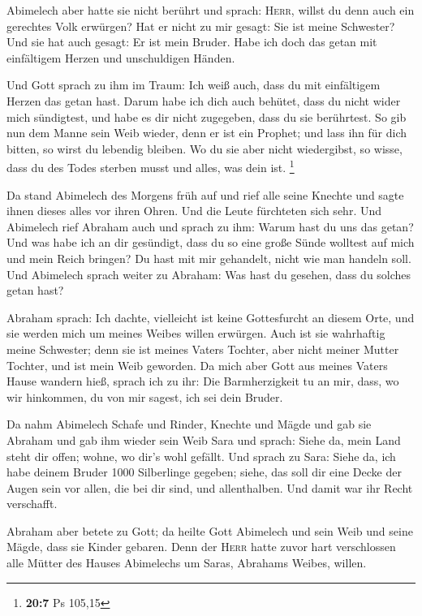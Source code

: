  Abimelech aber hatte sie nicht berührt und sprach:
\textsc{Herr}, willst du denn auch ein gerechtes Volk erwürgen?
 Hat er nicht zu mir gesagt: Sie ist meine Schwester? Und
sie hat auch gesagt: Er ist mein Bruder. Habe ich doch das getan mit
einfältigem Herzen und unschuldigen Händen.

 Und Gott sprach zu ihm im Traum: Ich weiß auch, dass du
mit einfältigem Herzen das getan hast. Darum habe ich dich auch behütet,
dass du nicht wider mich sündigtest, und habe es dir nicht zugegeben,
dass du sie berührtest.  So gib nun dem Manne sein Weib
wieder, denn er ist ein Prophet; und lass ihn für dich bitten, so wirst
du lebendig bleiben. Wo du sie aber nicht wiedergibst, so wisse, dass du
des Todes sterben musst und alles, was dein ist. \footnote{\textbf{20:7}
  Ps 105,15}

 Da stand Abimelech des Morgens früh auf und rief alle
seine Knechte und sagte ihnen dieses alles vor ihren Ohren. Und die
Leute fürchteten sich sehr.  Und Abimelech rief Abraham
auch und sprach zu ihm: Warum hast du uns das getan? Und was habe ich an
dir gesündigt, dass du so eine große Sünde wolltest auf mich und mein
Reich bringen? Du hast mit mir gehandelt, nicht wie man handeln soll.
 Und Abimelech sprach weiter zu Abraham: Was hast du
gesehen, dass du solches getan hast?

 Abraham sprach: Ich dachte, vielleicht ist keine
Gottesfurcht an diesem Orte, und sie werden mich um meines Weibes willen
erwürgen.  Auch ist sie wahrhaftig meine Schwester; denn
sie ist meines Vaters Tochter, aber nicht meiner Mutter Tochter, und ist
mein Weib geworden.  Da mich aber Gott aus meines Vaters
Hause wandern hieß, sprach ich zu ihr: Die Barmherzigkeit tu an mir,
dass, wo wir hinkommen, du von mir sagest, ich sei dein Bruder.

 Da nahm Abimelech Schafe und Rinder, Knechte und Mägde
und gab sie Abraham und gab ihm wieder sein Weib Sara 
und sprach: Siehe da, mein Land steht dir offen; wohne, wo dir's wohl
gefällt.  Und sprach zu Sara: Siehe da, ich habe deinem
Bruder 1000 Silberlinge gegeben; siehe, das soll dir eine Decke der
Augen sein vor allen, die bei dir sind, und allenthalben. Und damit war
ihr Recht verschafft.

 Abraham aber betete zu Gott; da heilte Gott Abimelech
und sein Weib und seine Mägde, dass sie Kinder gebaren. 
Denn der \textsc{Herr} hatte zuvor hart verschlossen alle Mütter des
Hauses Abimelechs um Saras, Abrahams Weibes, willen.

